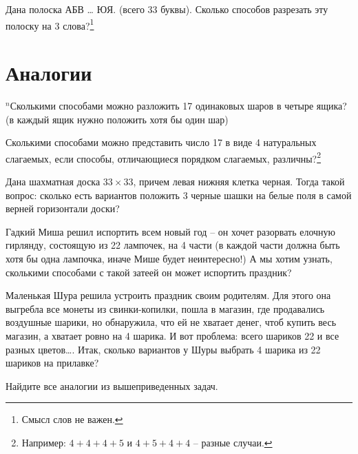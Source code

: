 \begin{thm}
	Дана полоска АБВ … ЮЯ. (всего 33 буквы). Сколько способов разрезать эту полоску на 3 слова?\footnote{Смысл слов не важен.}
\end{thm}

\section{Аналогии}

\begin{thm}
	$^n$Сколькими способами можно разложить 17 одинаковых шаров в четыре ящика? (в каждый ящик нужно положить хотя бы один шар)
\end{thm}

\begin{thm}
	Сколькими способами можно представить число 17 в виде 4 натуральных слагаемых, если способы, отличающиеся порядком слагаемых, различны?\footnote{Например: $4+4+4+5$ и $4+5+4+4$ -- разные случаи.}
\end{thm}

\begin{thm}
	Дана шахматная доска $33\times33$, причем левая нижняя клетка черная. Тогда такой вопрос: сколько есть вариантов положить 3 черные шашки на белые поля в самой верней горизонтали доски?
\end{thm}

\begin{thm}
	Гадкий Миша решил испортить всем новый год – он хочет разорвать елочную гирлянду, состоящую из 22 лампочек, на 4 части (в каждой части должна быть хотя бы одна лампочка, иначе Мише будет неинтересно!) А мы хотим узнать, сколькими способами с такой затеей он может испортить праздник?
\end{thm}

\begin{thm}
	Маленькая Шура решила устроить праздник своим родителям. Для этого она выгребла все монеты из свинки-копилки, пошла в магазин, где продавались воздушные шарики, но обнаружила, что ей не хватает денег, чтоб купить весь магазин, а хватает ровно на 4 шарика. И вот проблема: всего шариков 22 и все разных цветов…. Итак, сколько вариантов у Шуры выбрать 4 шарика из 22 шариков на прилавке?
\end{thm}

\begin{ex}
	Найдите все аналогии из вышеприведенных задач.
\end{ex}

